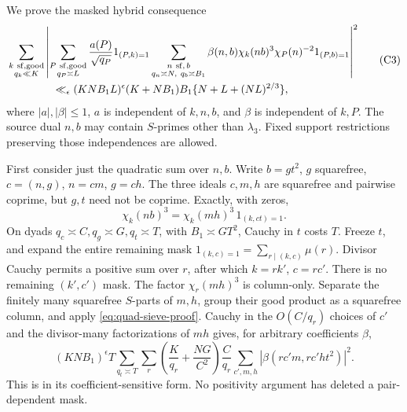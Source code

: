 \documentclass[12pt]{article}
\begin{document}
We prove the masked hybrid consequence
\[
 \begin{split}
 &\sum_{\substack{k\ {\rm sf,good}\\q_k\ll K}}
 \left|\sum_{\substack{P\ {\rm sf,good}\\q_P\asymp L}}
 \frac{a(P)}{\sqrt{q_P}}1_{(P,k)=1}
 \sum_{\substack{n\ {\rm sf},\,b\\q_n\asymp N,\ q_b\asymp B_1}}
      \beta(n,b)\chi_k(nb)^3\chi_P(n)^{-2}1_{(P,b)=1}\right|^2\\
 &\hspace{15mm}\ll_\epsilon
       (KNB_1L)^\epsilon(K+NB_1)B_1\{N+L+(NL)^{2/3}\},
 \end{split}
 \tag{C3}\label{eq:hybrid-proof}
\]
where \(|a|,|\beta|\le1\), \(a\) is independent of \(k,n,b\),
and \(\beta\) is independent of \(k,P\).
The source dual \(n,b\) may contain \(S\)-primes other than
\(\lambda_3\).  Fixed support restrictions preserving those
independences are allowed.

First consider just the quadratic sum over \(n,b\).
Write \(b=gt^2\), \(g\) squarefree,
\(c=(n,g)\), \(n=cm\), \(g=ch\).
The three ideals \(c,m,h\) are squarefree and pairwise coprime,
but \(g,t\) need not be coprime.
Exactly, with zeros,
\[
 \chi_k(nb)^3=\chi_k(mh)^3\,1_{(k,ct)=1}.
\]
On dyads \(q_c\asymp C,q_g\asymp G,q_t\asymp T\), with
\(B_1\asymp GT^2\), Cauchy in \(t\) costs \(T\).
Freeze \(t\), and expand the entire remaining mask
\(1_{(k,c)=1}=\sum_{r\mid(k,c)}\mu(r)\).
Divisor Cauchy permits a positive sum over \(r\), after which
\(k=rk'\), \(c=rc'\).  There is no remaining \((k',c')\) mask.
The factor \(\chi_r(mh)^3\) is column-only.
Separate the finitely many squarefree \(S\)-parts of \(m,h\),
group their good product as a squarefree column, and apply
\eqref{eq:quad-sieve-proof}.  Cauchy in the \(O(C/q_r)\)
choices of \(c'\) and the divisor-many factorizations of \(mh\)
gives, for arbitrary coefficients \(\beta\),
\[
 (KNB_1)^\epsilon T\sum_{q_t\asymp T}\sum_r
  \left(\frac K{q_r}+\frac{NG}{C^2}\right)\frac C{q_r}
  \sum_{c',m,h}|\beta(rc'm,rc'ht^2)|^2 .
 \tag{C4}\label{eq:completed-quad-proof}
\]
This is \cite[Lemma 5.5]{QRH} in its coefficient-sensitive form.
No positivity argument has deleted a pair-dependent mask.
\end{document}
